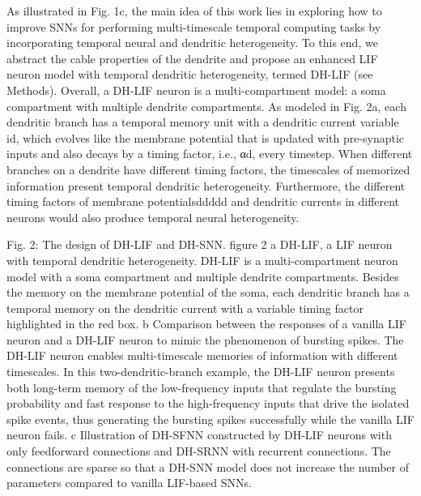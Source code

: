 As illustrated in Fig. 1c, the main idea of this work lies in exploring how to improve SNNs for performing multi-timescale temporal computing tasks by incorporating temporal neural and dendritic heterogeneity. To this end, we abstract the cable properties of the dendrite and propose an enhanced LIF neuron model with temporal dendritic heterogeneity, termed DH-LIF (see Methods). Overall, a DH-LIF neuron is a multi-compartment model: a soma compartment with multiple dendrite compartments. As modeled in Fig. 2a, each dendritic branch has a temporal memory unit with a dendritic current variable id, which evolves like the membrane potential that is updated with pre-synaptic inputs and also decays by a timing factor, i.e., αd, every timestep. When different branches on a dendrite have different timing factors, the timescales of memorized information present temporal dendritic heterogeneity. Furthermore, the different timing factors of membrane potentialsddddd and dendritic currents in different neurons would also produce temporal neural heterogeneity.

Fig. 2: The design of DH-LIF and DH-SNN.
figure 2
a DH-LIF, a LIF neuron with temporal dendritic heterogeneity. DH-LIF is a multi-compartment neuron model with a soma compartment and multiple dendrite compartments. Besides the memory on the membrane potential of the soma, each dendritic branch has a temporal memory on the dendritic current with a variable timing factor highlighted in the red box. b Comparison between the responses of a vanilla LIF neuron and a DH-LIF neuron to mimic the phenomenon of bursting spikes. The DH-LIF neuron enables multi-timescale memories of information with different timescales. In this two-dendritic-branch example, the DH-LIF neuron presents both long-term memory of the low-frequency inputs that regulate the bursting probability and fast response to the high-frequency inputs that drive the isolated spike events, thus generating the bursting spikes successfully while the vanilla LIF neuron fails. c Illustration of DH-SFNN constructed by DH-LIF neurons with only feedforward connections and DH-SRNN with recurrent connections. The connections are sparse so that a DH-SNN model does not increase the number of parameters compared to vanilla LIF-based SNNs.

